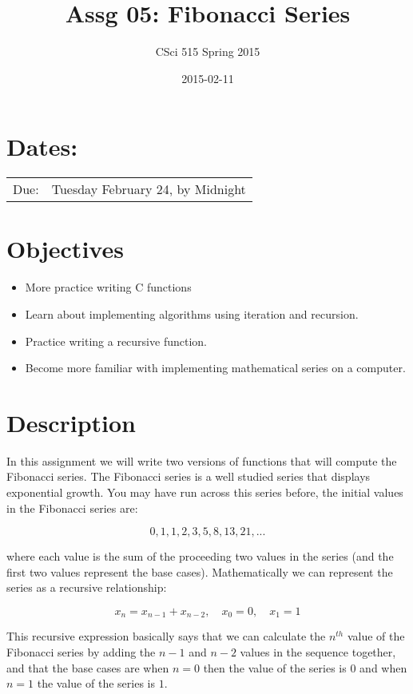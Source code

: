 \documentclass[11pt]{article}
\title{Assg 05: Fibonacci Series}
\author{CSci 515 Spring 2015}
\date{2015-02-11}
\begin{document}
\maketitle


\section*{Dates:}
\label{sec-1}


\begin{center}
\begin{tabular}{ll}
 Due:  &  Tuesday February 24, by Midnight  \\
\end{tabular}
\end{center}
\section*{Objectives}
\label{sec-2}

\begin{itemize}
\item More practice writing C functions
\item Learn about implementing algorithms using iteration and recursion.
\item Practice writing a recursive function.
\item Become more familiar with implementing mathematical series on a computer.
\end{itemize}
\section*{Description}
\label{sec-3}

In this assignment we will write two versions of functions that will
compute the Fibonacci series.  The Fibonacci series is a well studied
series that displays exponential growth.  You may have run across this
series before, the initial values in the Fibonacci series are:

$$
0, 1, 1, 2, 3, 5, 8, 13, 21, ...
$$

where each value is the sum of the proceeding two values in the series
(and the first two values represent the base cases).  Mathematically
we can represent the series as a recursive relationship:

$$
x_n = x_{n-1} + x_{n-2}, \quad x_0 = 0, \quad x_1 = 1
$$

This recursive expression basically says that we can calculate the
$n^{th}$ value of the Fibonacci series by adding the $n-1$ and $n-2$
values in the sequence together, and that the base cases are when $n=0$
then the value of the series is $0$ and when $n=1$ the value of the
series is $1$.
\end{document}
